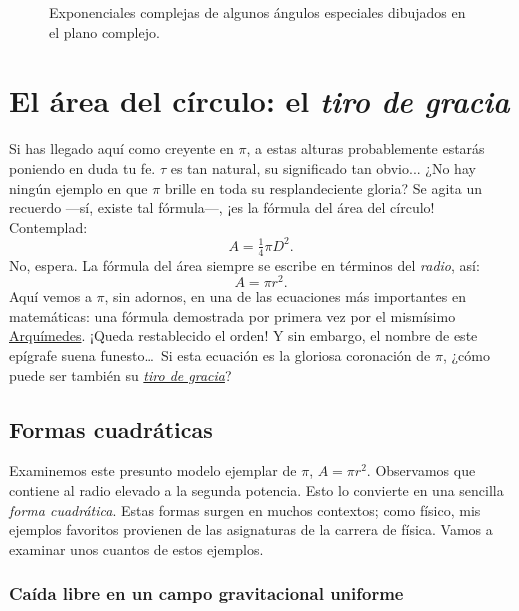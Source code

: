 \begin{figure}
\begin{center}
\end{center}
\caption{Exponenciales complejas de algunos ángulos especiales dibujados en el plano complejo.\label{fig:tau_euler_circle}}
\end{figure}


\section{El área del círculo: el \emph{tiro de gracia}} %
\label{sec:circular_area}

Si has llegado aquí como creyente en $\pi$, a estas alturas probablemente estarás poniendo en duda tu fe. $\tau$ es tan natural, su significado tan obvio... ¿No hay ningún ejemplo en que $\pi$ brille en toda su resplandeciente gloria? Se agita un recuerdo ---sí, existe tal fórmula---, ¡es la fórmula del área del círculo! Contemplad:
\[ A = \tfrac{1}{4} \pi D^2. \]
No, espera. La fórmula del área siempre se escribe en términos del \emph{radio}, así:
\[ A = \pi r^2. \]
Aquí vemos a $\pi$, sin adornos, en una de las ecuaciones más importantes en matemáticas: una fórmula demostrada por primera vez por el mismísimo \href{https://es.wikipedia.org/wiki/Arquímedes}{Arquímedes}. ¡Queda restablecido el orden! Y sin embargo, el nombre de este epígrafe suena funesto\ldots\ Si esta ecuación es la gloriosa coronación de $\pi$, ¿cómo puede ser también su \href{https://es.wikipedia.org/wiki/Tiro_de_gracia}{\emph{tiro de gracia}}?


  \subsection{Formas cuadráticas} %
  \label{sec:quadratic_forms}

Examinemos este presunto modelo ejemplar de $\pi$, $A = \pi r^2$. Observamos que contiene al radio elevado a la segunda potencia. Esto lo convierte en una sencilla \emph{forma cuadrática}. Estas formas surgen en muchos contextos; como físico, mis ejemplos favoritos provienen de las asignaturas de la carrera de física. Vamos a examinar unos cuantos de estos ejemplos.

    \subsubsection{Caída libre en un campo gravitacional uniforme} %
    \label{sec:falling_in_a_uniform_gravitational_field}

